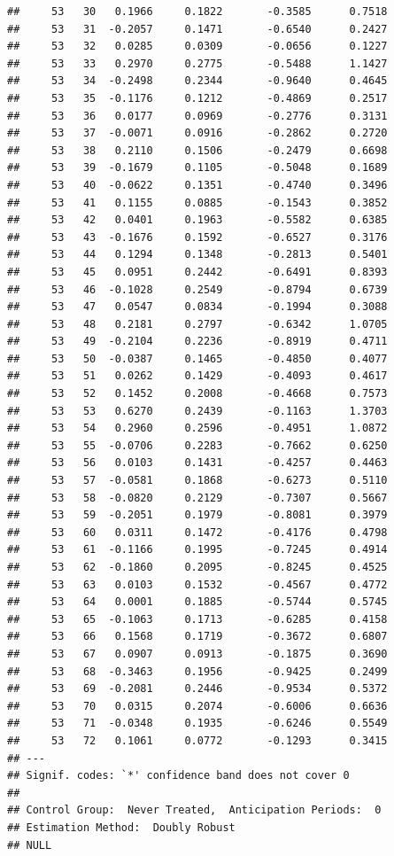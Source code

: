 \documentclass[
]{article}
\begin{document}
\begin{verbatim}
##     53   30   0.1966     0.1822       -0.3585      0.7518  
##     53   31  -0.2057     0.1471       -0.6540      0.2427  
##     53   32   0.0285     0.0309       -0.0656      0.1227  
##     53   33   0.2970     0.2775       -0.5488      1.1427  
##     53   34  -0.2498     0.2344       -0.9640      0.4645  
##     53   35  -0.1176     0.1212       -0.4869      0.2517  
##     53   36   0.0177     0.0969       -0.2776      0.3131  
##     53   37  -0.0071     0.0916       -0.2862      0.2720  
##     53   38   0.2110     0.1506       -0.2479      0.6698  
##     53   39  -0.1679     0.1105       -0.5048      0.1689  
##     53   40  -0.0622     0.1351       -0.4740      0.3496  
##     53   41   0.1155     0.0885       -0.1543      0.3852  
##     53   42   0.0401     0.1963       -0.5582      0.6385  
##     53   43  -0.1676     0.1592       -0.6527      0.3176  
##     53   44   0.1294     0.1348       -0.2813      0.5401  
##     53   45   0.0951     0.2442       -0.6491      0.8393  
##     53   46  -0.1028     0.2549       -0.8794      0.6739  
##     53   47   0.0547     0.0834       -0.1994      0.3088  
##     53   48   0.2181     0.2797       -0.6342      1.0705  
##     53   49  -0.2104     0.2236       -0.8919      0.4711  
##     53   50  -0.0387     0.1465       -0.4850      0.4077  
##     53   51   0.0262     0.1429       -0.4093      0.4617  
##     53   52   0.1452     0.2008       -0.4668      0.7573  
##     53   53   0.6270     0.2439       -0.1163      1.3703  
##     53   54   0.2960     0.2596       -0.4951      1.0872  
##     53   55  -0.0706     0.2283       -0.7662      0.6250  
##     53   56   0.0103     0.1431       -0.4257      0.4463  
##     53   57  -0.0581     0.1868       -0.6273      0.5110  
##     53   58  -0.0820     0.2129       -0.7307      0.5667  
##     53   59  -0.2051     0.1979       -0.8081      0.3979  
##     53   60   0.0311     0.1472       -0.4176      0.4798  
##     53   61  -0.1166     0.1995       -0.7245      0.4914  
##     53   62  -0.1860     0.2095       -0.8245      0.4525  
##     53   63   0.0103     0.1532       -0.4567      0.4772  
##     53   64   0.0001     0.1885       -0.5744      0.5745  
##     53   65  -0.1063     0.1713       -0.6285      0.4158  
##     53   66   0.1568     0.1719       -0.3672      0.6807  
##     53   67   0.0907     0.0913       -0.1875      0.3690  
##     53   68  -0.3463     0.1956       -0.9425      0.2499  
##     53   69  -0.2081     0.2446       -0.9534      0.5372  
##     53   70   0.0315     0.2074       -0.6006      0.6636  
##     53   71  -0.0348     0.1935       -0.6246      0.5549  
##     53   72   0.1061     0.0772       -0.1293      0.3415  
## ---
## Signif. codes: `*' confidence band does not cover 0
## 
## Control Group:  Never Treated,  Anticipation Periods:  0
## Estimation Method:  Doubly Robust
## NULL
\end{verbatim}
\end{document}
